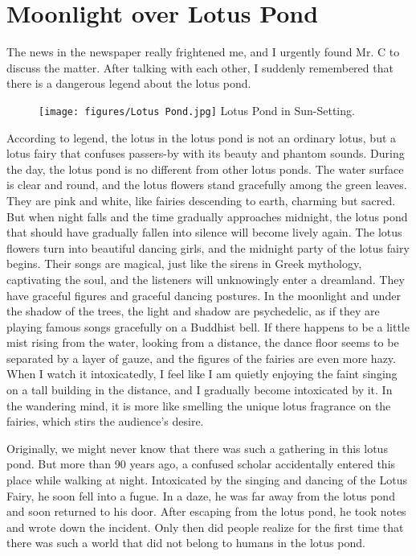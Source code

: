 \chapter{Moonlight over Lotus Pond}

The news in the newspaper really frightened me, and I urgently found Mr. C to
discuss the matter. After talking with each other, I suddenly remembered that
there is a dangerous legend about the lotus pond.

\begin{figure}[!b]
	\centering
	\texttt{[image: figures/Lotus Pond.jpg]}
	Lotus Pond in Sun-Setting.
\end{figure}

According to legend, the lotus in the lotus pond is not an ordinary lotus, but
a lotus fairy that confuses passers-by with its beauty and phantom sounds.
During the day, the lotus pond is no different from other lotus ponds. The
water surface is clear and round, and the lotus flowers stand gracefully among
the green leaves. They are pink and white, like fairies descending to earth,
charming but sacred.  But when night falls and the time gradually approaches
midnight, the lotus pond that should have gradually fallen into silence will
become lively again. The lotus flowers turn into beautiful dancing girls, and
the midnight party of the lotus fairy begins.  Their songs are magical, just
like the sirens in Greek mythology, captivating the soul, and the listeners
will unknowingly enter a dreamland.  They have graceful figures and graceful
dancing postures. In the moonlight and under the shadow of the trees, the light
and shadow are psychedelic, as if they are playing famous songs gracefully on a
Buddhist bell.  If there happens to be a little mist rising from the water,
looking from a distance, the dance floor seems to be separated by a layer of
gauze, and the figures of the fairies are even more hazy. When I watch it
intoxicatedly, I feel like I am quietly enjoying the faint singing on a tall
building in the distance, and I gradually become intoxicated by it. In the
wandering mind, it is more like smelling the unique lotus fragrance on the
fairies, which stirs the audience's desire.

Originally, we might never know that there was such a gathering in this lotus
pond.  But more than 90 years ago, a confused scholar accidentally entered this
place while walking at night. Intoxicated by the singing and dancing of the
Lotus Fairy, he soon fell into a fugue. In a daze, he was far away from the
lotus pond and soon returned to his door.  After escaping from the lotus pond,
he took notes and wrote down the incident. Only then did people realize for the
first time that there was such a world that did not belong to humans in the
lotus pond.

